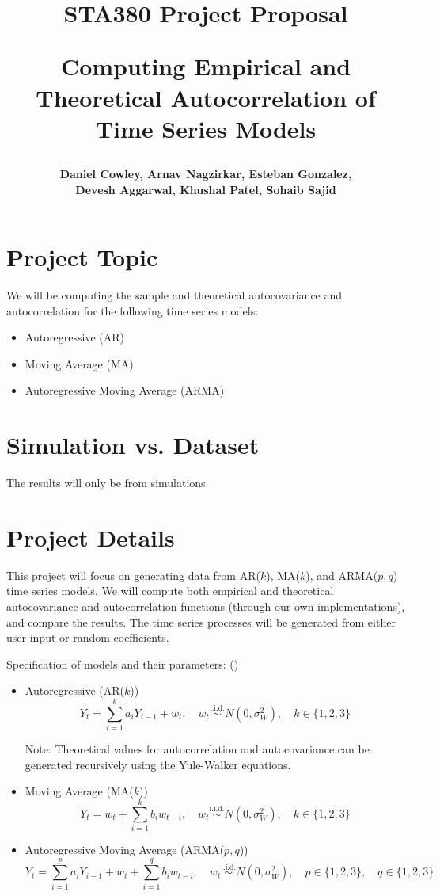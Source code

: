 \documentclass[11pt]{article}
\title{{\textbf{STA380 Project Proposal}}

\vspace{0.5 cm}

\Large Computing Empirical and Theoretical Autocorrelation of Time Series Models}
\author{\textbf{Daniel Cowley, Arnav Nagzirkar, Esteban Gonzalez, } \\
        \textbf{Devesh Aggarwal, Khushal Patel, Sohaib Sajid}}
\date{}
\begin{document}
\maketitle

\section{Project Topic}

We will be computing the sample and theoretical autocovariance and autocorrelation for the following time series models: 
\begin{itemize} 
    \item Autoregressive (AR) 
    \item Moving Average (MA) 
    \item Autoregressive Moving Average (ARMA) 
\end{itemize}

\section{Simulation vs. Dataset}

The results will only be from simulations.

\section{Project Details}

This project will focus on generating data from AR($k$), MA($k$), and ARMA($p,q$) time series models. We will compute both empirical and theoretical autocovariance and autocorrelation
functions (through our own implementations), and compare the results. The time series processes will be generated from either user input or random coefficients.

\vspace{0.5 cm}

\noindent Specification of models and their parameters: (\cite{johnson2009})
\begin{itemize}
    \item Autoregressive (AR($k$))
    \[Y_t = \sum_{i = 1}^k a_iY_{i - 1} + w_t, \quad w_t \overset{\text{i.i.d.}}{\sim} N(0, \sigma_W^2), \quad k \in \{1, 2, 3\}\]

    Note: Theoretical values for autocorrelation and autocovariance can be generated recursively using the Yule-Walker equations.

    \item Moving Average (MA($k$))
    \[Y_t = w_t + \sum_{i = 1}^k b_iw_{t - i}, \quad w_t \overset{\text{i.i.d.}}{\sim} N(0, \sigma_W^2), \quad k \in \{1, 2, 3\}\]

    \item Autoregressive Moving Average (ARMA($p, q$))
    \[Y_t = \sum_{i = 1}^p a_iY_{i - 1} + w_t + \sum_{i = 1}^q b_iw_{t - i}, \quad w_t \overset{\text{i.i.d.}}{\sim} N(0, \sigma_W^2), \quad p \in \{1, 2, 3\}, \quad q \in \{1, 2, 3\}\]
\end{itemize}
\end{document}
